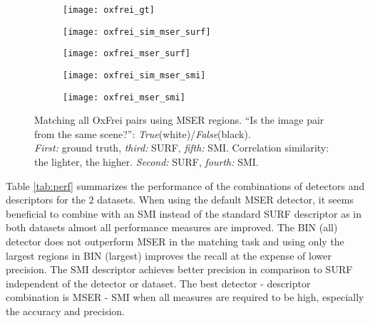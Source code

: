 \documentclass[a4paper,11pt]{article}
\begin{document}
\begin{figure}[h]
 \vspace{-10pt} 
\begin{center}
\begin{subfigure}[b]{0.18\textwidth}
  \texttt{[image: oxfrei\_gt]}
\end{subfigure}
\begin{subfigure}[b]{0.18\textwidth}
\texttt{[image: oxfrei\_sim\_mser\_surf]}
\end{subfigure}
\begin{subfigure}[b]{0.18\textwidth}
  \texttt{[image: oxfrei\_mser\_surf]}
\end{subfigure}
\begin{subfigure}[b]{0.18\textwidth}
\texttt{[image: oxfrei\_sim\_mser\_smi]}
\end{subfigure}
\begin{subfigure}[b]{0.18\textwidth}
  \texttt{[image: oxfrei\_mser\_smi]}
\end{subfigure}
\end{center}
\vspace{-20pt}

\caption{\footnotesize Matching all OxFrei pairs using MSER regions. ``Is the image pair from the same scene?'': {\em True}(white)/{\em False}(black). \\
{\em First:} ground truth, {\em third:} SURF, {\em fifth:} SMI. Correlation similarity: the lighter, the higher. {\em Second:} SURF, {\em fourth:} SMI. }
\label{fig:matching2}
  \vspace{-12pt}
\end{figure}


Table \ref{tab:perf} summarizes the performance of the combinations of detectors and descriptors for the $2$ datasets. When using the default MSER detector, it seems beneficial to combine with an SMI instead of the standard SURF descriptor as in both datasets almost all performance measures are improved. The BIN (all) detector does not outperform MSER in the matching task and using only the largest regions in BIN (largest) improves the recall at the expense of lower precision. The SMI descriptor achieves better precision in comparison to SURF independent of the detector or dataset. The best detector - descriptor combination is MSER - SMI when all measures are required to be high, especially the accuracy and precision.
\end{document}
